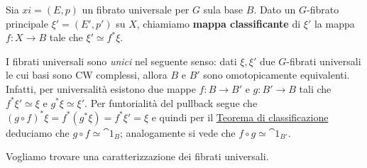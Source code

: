 


\begin{df}
Sia $xi = (E,p)$ un fibrato universale per $G$ sula base $B$.
Dato un $G$-fibrato principale $\xi'= (E',p')$ su $X$,
chiamiamo \textbf{mappa classificante} di $\xi'$
la mappa $f:X \to B$ tale che $\xi' \simeq f^{*}\xi$.
\end{df}

\begin{oss}
	I fibrati universali sono \emph{unici} nel seguente senso:	
	dati $\xi, \xi'$ due $G$-fibrati universali le cui basi sono
	CW complessi, allora $B$ e $B'$ sono omotopicamente equivalenti.
	Infatti, per universalità esistono due mappe 
	$f:B \to B'$ e $g:B' \to B$ tali che $f^{*}\xi' \simeq \xi$
	e $ g^{*}\xi \simeq \xi'$.  Per funtorialità del pullback
	segue che $(g \circ f)^{*}\xi = f^{*}(g^{*}\xi) = f^{*} \xi' = \xi$
	e quindi per il \hyperref[teo-classificazione]{Teorema di classificazione}
	deduciamo che $g \circ f \simeq \cat{1}_{B}$;
	analogamente si vede che $f \circ g \simeq \cat{1}_{B'}$.
\end{oss}

Vogliamo trovare una caratterizzazione dei fibrati universali.


